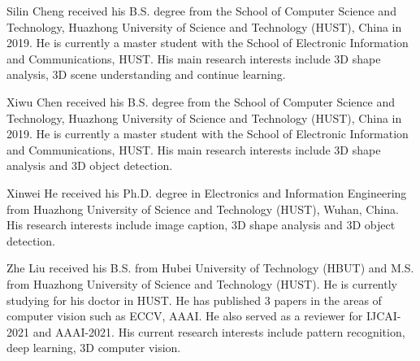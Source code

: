\documentclass[journal]{IEEEtran}
\begin{document}
\ifCLASSOPTIONcaptionsoff
  \newpage
\fi







{\small


}









\begin{IEEEbiography}{Silin Cheng}
received his B.S. degree from the School of Computer Science and Technology, Huazhong University of Science and Technology (HUST), China in 2019. He is currently a master
student with the School of Electronic Information and Communications, HUST. His main research interests include 3D shape analysis, 3D scene understanding and continue learning.
\end{IEEEbiography}

\begin{IEEEbiography}{Xiwu Chen}
received his B.S. degree from the School of Computer Science and Technology, Huazhong University of Science and Technology (HUST), China in 2019. He is currently a master student with the School of Electronic Information and Communications, HUST. His main research interests include 3D shape analysis and 3D object detection.
\end{IEEEbiography}

\begin{IEEEbiography}{Xinwei He}
received his Ph.D. degree in Electronics and Information Engineering from Huazhong University
of Science and Technology (HUST), Wuhan, China. His research interests include image caption, 3D shape analysis and 3D object detection.
\end{IEEEbiography}

\begin{IEEEbiography}{Zhe Liu}
received his B.S. from Hubei University of Technology (HBUT) and M.S. from Huazhong University of Science and Technology (HUST). He is currently studying for his doctor in HUST. He has published 3 papers in the areas of computer vision such as ECCV, AAAI. He also served as a reviewer for IJCAI-2021 and AAAI-2021. His current research interests include pattern recognition, deep learning, 3D computer vision.
\end{IEEEbiography}
\end{document}

